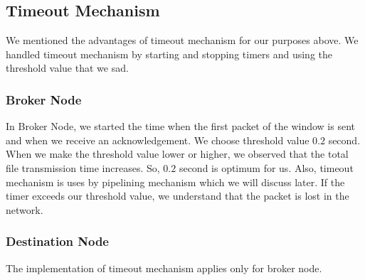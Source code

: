 \documentclass[conference]{IEEEtran}
\begin{document}
\subsection{Timeout Mechanism}
We mentioned the advantages of timeout mechanism for our purposes above. We handled timeout mechanism by starting and stopping timers and using the threshold value that we sad.
\subsubsection{Broker Node}
In Broker Node, we started the time when the first packet of the window is sent and when we receive an acknowledgement. We choose threshold value $0.2$ second. When we make the threshold value lower or higher, we observed that the total file transmission time increases. So, $0.2$ second is optimum for us. Also, timeout mechanism is uses by pipelining mechanism which we will discuss later. If the timer exceeds our threshold value, we understand that the packet is lost in the network.
\subsubsection{Destination Node}
The implementation of timeout mechanism applies only for broker node.
\end{document}
